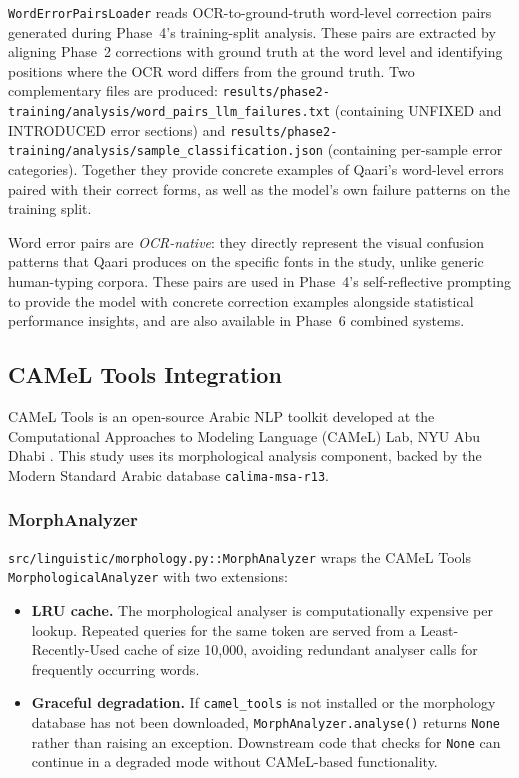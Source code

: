 \texttt{WordErrorPairsLoader} reads OCR-to-ground-truth word-level correction
pairs generated during Phase~4's training-split analysis. These pairs are
extracted by aligning Phase~2 corrections with ground truth at the word level
and identifying positions where the OCR word differs from the ground truth.
Two complementary files are produced:
\texttt{results/phase2-training/analysis/word\_pairs\_llm\_failures.txt}
(containing UNFIXED and INTRODUCED error sections) and
\texttt{results/phase2-training/analysis/sample\_classification.json}
(containing per-sample error categories).
Together they provide concrete examples of Qaari's word-level errors paired
with their correct forms, as well as the model's own failure patterns on the
training split.

Word error pairs are \emph{OCR-native}: they directly represent the visual
confusion patterns that Qaari produces on the specific fonts in the study,
unlike generic human-typing corpora.
These pairs are used in Phase~4's self-reflective prompting to provide
the model with concrete correction examples alongside statistical performance
insights, and are also available in Phase~6 combined systems.

\subsection{CAMeL Tools Integration}
\label{subsec:kb_camel}

CAMeL Tools is an open-source Arabic NLP toolkit developed at the Computational
Approaches to Modeling Language (CAMeL) Lab, NYU Abu Dhabi \cite{obeid2020camel}.
This study uses its morphological analysis component, backed by the Modern Standard
Arabic database \texttt{calima-msa-r13}.

\subsubsection{MorphAnalyzer}

\texttt{src/linguistic/morphology.py::MorphAnalyzer} wraps the CAMeL Tools
\texttt{MorphologicalAnalyzer} with two extensions:

\begin{itemize}
  \item \textbf{LRU cache.}
        The morphological analyser is computationally expensive per lookup.
        Repeated queries for the same token are served from a Least-Recently-Used
        cache of size 10,000, avoiding redundant analyser calls for frequently
        occurring words.

  \item \textbf{Graceful degradation.}
        If \texttt{camel\_tools} is not installed or the morphology database has
        not been downloaded, \texttt{MorphAnalyzer.analyse()} returns \texttt{None}
        rather than raising an exception.
        Downstream code that checks for \texttt{None} can continue in a degraded
        mode without CAMeL-based functionality.
\end{itemize}

